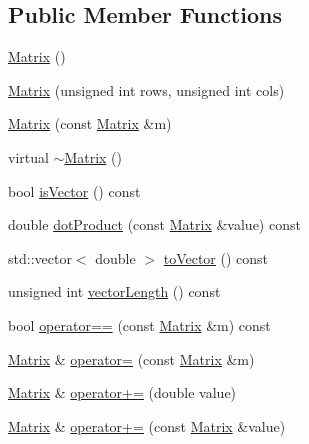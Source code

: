 \subsection*{Public Member Functions}
\begin{DoxyCompactItemize}
\item 
\hyperlink{classopen_mind_1_1math_1_1_matrix_a54bf6fe1b67273f245745854ab588e61}{Matrix} ()
\item 
\hyperlink{classopen_mind_1_1math_1_1_matrix_a88a85487471031c0370a88de3ea50378}{Matrix} (unsigned int rows, unsigned int cols)
\item 
\hyperlink{classopen_mind_1_1math_1_1_matrix_aeb902d965006e63260fbe15b01e41026}{Matrix} (const \hyperlink{classopen_mind_1_1math_1_1_matrix}{Matrix} \&m)
\item 
virtual \hyperlink{classopen_mind_1_1math_1_1_matrix_a6a6be308181cc5c1319261fb9461fd54}{$\sim$\+Matrix} ()
\item 
bool \hyperlink{classopen_mind_1_1math_1_1_matrix_a70cc7f8934cb5f3298135f31137e5fa0}{is\+Vector} () const 
\item 
double \hyperlink{classopen_mind_1_1math_1_1_matrix_acdfc93d350df555ae725fddebc133c11}{dot\+Product} (const \hyperlink{classopen_mind_1_1math_1_1_matrix}{Matrix} \&value) const 
\item 
std\+::vector$<$ double $>$ \hyperlink{classopen_mind_1_1math_1_1_matrix_a34f7a0d6dbe7c9d6848e007268ccab13}{to\+Vector} () const 
\item 
unsigned int \hyperlink{classopen_mind_1_1math_1_1_matrix_ad567b12966ba791cc4158b02853615f1}{vector\+Length} () const 
\item 
bool \hyperlink{classopen_mind_1_1math_1_1_matrix_a6d7ef90c143858bf74c4fc11e7ec633b}{operator==} (const \hyperlink{classopen_mind_1_1math_1_1_matrix}{Matrix} \&m) const 
\item 
\hyperlink{classopen_mind_1_1math_1_1_matrix}{Matrix} \& \hyperlink{classopen_mind_1_1math_1_1_matrix_a04d19b5568c543101a2053d2c400b2c5}{operator=} (const \hyperlink{classopen_mind_1_1math_1_1_matrix}{Matrix} \&m)
\item 
\hyperlink{classopen_mind_1_1math_1_1_matrix}{Matrix} \& \hyperlink{classopen_mind_1_1math_1_1_matrix_a000b390ebb8fb9af8859023253df1eb0}{operator+=} (double value)
\item 
\hyperlink{classopen_mind_1_1math_1_1_matrix}{Matrix} \& \hyperlink{classopen_mind_1_1math_1_1_matrix_aea27f33793c79d874ddf7d334e3d63c3}{operator+=} (const \hyperlink{classopen_mind_1_1math_1_1_matrix}{Matrix} \&value)

\end{DoxyCompactItemize}
